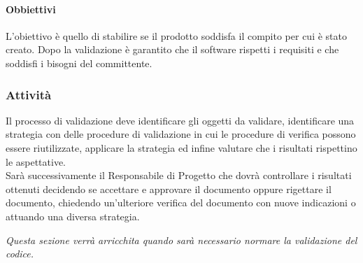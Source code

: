 			\paragraph{Obbiettivi}
				L’obiettivo è quello di stabilire se il prodotto soddisfa il compito per cui è stato creato. Dopo la validazione è garantito che il software rispetti i requisiti e che soddisfi i bisogni del committente.
		\subsubsection{Attività}
			Il processo di validazione deve identificare gli oggetti da validare, identificare una strategia con delle procedure di validazione in cui le procedure di verifica possono essere riutilizzate, applicare la strategia ed infine valutare che i risultati rispettino le aspettative.\\
			Sarà successivamente il Responsabile di Progetto che dovrà controllare i risultati ottenuti decidendo se accettare e approvare il documento oppure rigettare il documento, chiedendo un’ulteriore verifica del documento con nuove indicazioni o attuando una diversa strategia.\\
		\begin{center}
			\emph{Questa sezione verrà arricchita quando sarà necessario normare la validazione del codice.}
		\end{center}
\newpage
			
			
			
			
			